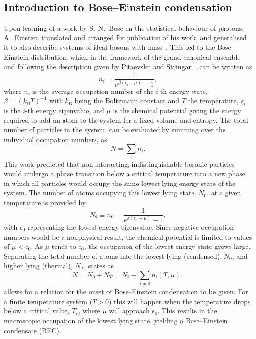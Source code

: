\subsection{Introduction to Bose--Einstein condensation}\label{sub:becintro}
Upon learning of a work by S.~N.~Bose on the statistical behaviour of photons, A.~Einstein translated and arranged for publication of his work, and generalised it to also describe systems of ideal bosons with mass~\cite{Einstein_bec_1925}. This led to the Bose--Einstein distribution, which in the framework of the grand canonical ensemble and following the description given by Pitaevskii and Stringari \cite[chap. 2]{BK:Pitaevskii_Stringari_2003}, can be written as
\begin{equation}
\bar{n}_i = \frac{1}{e^{\beta(\epsilon_i - \mu)} -1},
\end{equation}
where $\bar{n}_i$ is the average occupation number of the $i$-th energy state, $\beta=(k_{\textrm{B}}T)^{-1}$ with $k_{\textrm{B}}$ being the Boltzmann constant and $T$ the temperature, $\epsilon_i$ is the $i$-th energy eigenvalue, and $\mu$ is the chemical potential giving the energy required to add an atom to the system for a fixed volume and entropy. The total number of particles in the system, can be evaluated by summing over the individual occupation numbers, as
\begin{equation}
N=\displaystyle\sum_i \bar{n}_i.
\end{equation}
This work predicted that non-interacting, indistinguishable bosonic particles would undergo a phase transition below a critical temperature into a new phase in which all particles would occupy the same lowest lying energy state of the system. The number of atoms occupying this lowest lying state, $N_0$, at a given temperature is provided by
\begin{equation}
N_0 \equiv \bar{n}_0 = \frac{1}{e^{\beta(\epsilon_0 - \mu)} - 1},
\end{equation}
with $\epsilon_0$ representing the lowest energy eigenvalue. Since negative occupation numbers would be a nonphysical result, the chemical potential is limited to values of $\mu < \epsilon_0$. As $\mu$ tends to $\epsilon_0$, the occupation of the lowest energy state grows large. Separating the total number of atoms into the lowest lying (condensed), $N_0$, and higher lying (thermal), $N_T$, states as
\begin{equation}
N = N_0 + N_T = N_0 + \displaystyle\sum_{i\neq 0}\bar{n}_i(T,\mu),
\end{equation}
allows for a relation for the onset of Bose--Einstein condensation to be given. For a finite temperature system ($T>0$) this will happen when the temperature drops below a critical value, $T_{\textrm{c}}$, where $\mu$ will approach $\epsilon_0$. This results in the macroscopic occupation of the lowest lying state, yielding a Bose--Einstein condensate (BEC).


